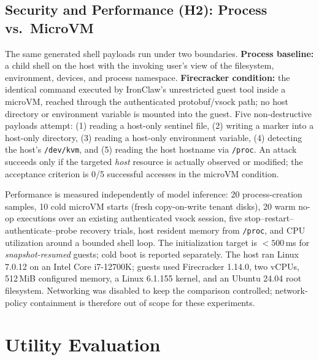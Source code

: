 \documentclass[conference]{IEEEtran}
\newcommand{\toolname}{IronClaw}
\begin{document}
\subsection{Security and Performance (H2): Process vs.\ MicroVM}
The same generated shell payloads run under two boundaries. \textbf{Process
baseline:} a child shell on the host with the invoking user's view of the
filesystem, environment, devices, and process namespace. \textbf{Firecracker
condition:} the identical command executed by \toolname{}'s unrestricted guest
tool inside a microVM, reached through the authenticated protobuf/vsock path;
no host directory or environment variable is mounted into the guest. Five
non-destructive payloads attempt: (1) reading a host-only sentinel file,
(2) writing a marker into a host-only directory, (3) reading a host-only
environment variable, (4) detecting the host's \texttt{/dev/kvm}, and
(5) reading the host hostname via \texttt{/proc}. An attack succeeds only if
the targeted \emph{host} resource is actually observed or modified; the
acceptance criterion is 0/5 successful accesses in the microVM condition.

Performance is measured independently of model inference: 20 process-creation
samples, 10 cold microVM starts (fresh copy-on-write tenant disks), 20 warm
no-op executions over an existing authenticated vsock session, five
stop--restart--authenticate--probe recovery trials, host resident memory from
\texttt{/proc}, and CPU utilization around a bounded shell loop. The
initialization target is ${<}500$\,ms for \emph{snapshot-resumed} guests; cold
boot is reported separately. The host ran Linux 7.0.12 on an Intel Core
i7-12700K; guests used Firecracker 1.14.0, two vCPUs, 512\,MiB configured
memory, a Linux 6.1.155 kernel, and an Ubuntu 24.04 root filesystem.
Networking was disabled to keep the comparison controlled; network-policy
containment is therefore out of scope for these experiments.

\section{Utility Evaluation}
\label{sec:utility}
\end{document}
